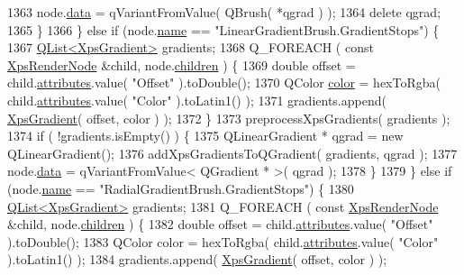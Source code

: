 \begin{DoxyCode}
1363             node.\hyperlink{classXpsRenderNode_a1b07b9ac5eb86bec6d9f94ec5c855065}{data} = qVariantFromValue( QBrush( *qgrad ) );
1364             \textcolor{keyword}{delete} qgrad;
1365         \}
1366     \} \textcolor{keywordflow}{else} \textcolor{keywordflow}{if} (node.\hyperlink{classXpsRenderNode_a7b3d33b9669c0235e095d5efc870ccf0}{name} == \textcolor{stringliteral}{"LinearGradientBrush.GradientStops"}) \{
1367         \hyperlink{classQList}{QList<XpsGradient>} gradients;
1368         Q\_FOREACH ( \textcolor{keyword}{const} \hyperlink{classXpsRenderNode}{XpsRenderNode} &child, node.\hyperlink{classXpsRenderNode_a8a1cc47feef96fa119b2491e60ebeb09}{children} ) \{
1369             \textcolor{keywordtype}{double} offset = child.\hyperlink{classXpsRenderNode_a7f6fca2e06dd119e7eb20139af6c8477}{attributes}.value( \textcolor{stringliteral}{"Offset"} ).toDouble();
1370             QColor \hyperlink{classglyph_ab4847af7a7b13322d5651fe47735c8dd}{color} = hexToRgba( child.\hyperlink{classXpsRenderNode_a7f6fca2e06dd119e7eb20139af6c8477}{attributes}.value( \textcolor{stringliteral}{"Color"} ).toLatin1() );
1371             gradients.append( \hyperlink{structXpsGradient}{XpsGradient}( offset, color ) );
1372         \}
1373         preprocessXpsGradients( gradients );
1374         \textcolor{keywordflow}{if} ( !gradients.isEmpty() ) \{
1375             QLinearGradient * qgrad = \textcolor{keyword}{new} QLinearGradient();
1376             addXpsGradientsToQGradient( gradients, qgrad );
1377             node.\hyperlink{classXpsRenderNode_a1b07b9ac5eb86bec6d9f94ec5c855065}{data} = qVariantFromValue< QGradient * >( qgrad );
1378         \}
1379     \} \textcolor{keywordflow}{else} \textcolor{keywordflow}{if} (node.\hyperlink{classXpsRenderNode_a7b3d33b9669c0235e095d5efc870ccf0}{name} == \textcolor{stringliteral}{"RadialGradientBrush.GradientStops"}) \{
1380         \hyperlink{classQList}{QList<XpsGradient>} gradients;
1381         Q\_FOREACH ( \textcolor{keyword}{const} \hyperlink{classXpsRenderNode}{XpsRenderNode} &child, node.\hyperlink{classXpsRenderNode_a8a1cc47feef96fa119b2491e60ebeb09}{children} ) \{
1382             \textcolor{keywordtype}{double} offset = child.\hyperlink{classXpsRenderNode_a7f6fca2e06dd119e7eb20139af6c8477}{attributes}.value( \textcolor{stringliteral}{"Offset"} ).toDouble();
1383             QColor color = hexToRgba( child.\hyperlink{classXpsRenderNode_a7f6fca2e06dd119e7eb20139af6c8477}{attributes}.value( \textcolor{stringliteral}{"Color"} ).toLatin1() );
1384             gradients.append( \hyperlink{structXpsGradient}{XpsGradient}( offset, color ) );

\end{DoxyCode}

